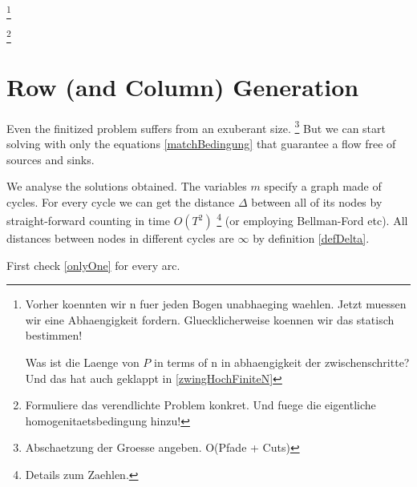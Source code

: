 \documentclass[a4paper]{amsart} %
\newcommand{\todo}[1]{\footnote{#1}}
\begin{document}
\todo{Vorher koennten wir n fuer jeden Bogen unabhaeging waehlen.  Jetzt
  muessen wir eine Abhaengigkeit fordern.  Gluecklicherweise koennen wir das statisch
  bestimmen!

  Was ist die Laenge von \(P\) in terms of n in abhaengigkeit der
  zwischenschritte?  Und das hat auch geklappt in \ref{zwingHochFiniteN}}

\todo{Formuliere das verendlichte Problem konkret.  Und fuege die eigentliche homogenitaetsbedingung hinzu!}

\section{Row (and Column) Generation}
Even the finitized problem suffers from an exuberant
size. \todo{Abschaetzung der Groesse angeben.  O(Pfade + Cuts)} But we
can start solving with only the equations \ref{matchBedingung} that
guarantee a flow free of sources and sinks.

We analyse the solutions obtained.  The variables \(m\) specify a
graph made of cycles.  For every cycle we can get the distance
\(\Delta\) between all of its nodes by straight-forward counting in
time \(O(T^2)\) \todo{Details zum Zaehlen.} (or employing Bellman-Ford
etc).  All distances between nodes in different cycles are \(\infty\)
by definition \ref{defDelta}.

First check \ref{onlyOne} for every arc.
\end{document}
